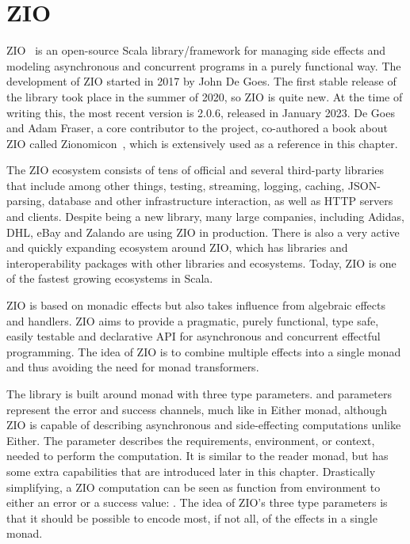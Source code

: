 \chapter{ZIO} \label{zio}

ZIO~\cite{zio} is an open-source Scala library/framework for managing side effects and modeling asynchronous and concurrent programs in a purely functional way. The development of ZIO started in 2017 by John De Goes. The first stable release of the library took place in the summer of 2020, so ZIO is quite new. At the time of writing this, the most recent version is 2.0.6, released in January 2023. De Goes and Adam Fraser, a core contributor to the project, co-authored a book about ZIO called Zionomicon~\cite{zionomicon}, which is extensively used as a reference in this chapter.

The ZIO ecosystem consists of tens of official and several third-party libraries that include among other things, testing, streaming, logging, caching, JSON-parsing, database and other infrastructure interaction, as well as HTTP servers and clients. Despite being a new library, many large companies, including Adidas, DHL, eBay and Zalando are using ZIO in production. There is also a very active and quickly expanding ecosystem around ZIO, which has libraries and interoperability packages with other libraries and ecosystems. Today, ZIO is one of the fastest growing ecosystems in Scala.

ZIO is based on monadic effects but also takes influence from algebraic effects and handlers. ZIO aims to provide a pragmatic, purely functional, type safe, easily testable and declarative API for asynchronous and concurrent effectful programming. The idea of ZIO is to combine multiple effects into a single monad and thus avoiding the need for monad transformers.

The library is built around  monad with three type parameters.  and  parameters represent the error and success channels, much like in Either monad, although ZIO is capable of describing asynchronous and side-effecting computations unlike Either. The  parameter describes the requirements, environment, or context, needed to perform the computation. It is similar to the reader monad, but has some extra capabilities that are introduced later in this chapter. Drastically simplifying, a ZIO computation can be seen as function from environment to either an error or a success value: . The idea of ZIO's three type parameters is that it should be possible to encode most, if not all, of the effects in a single monad. 

